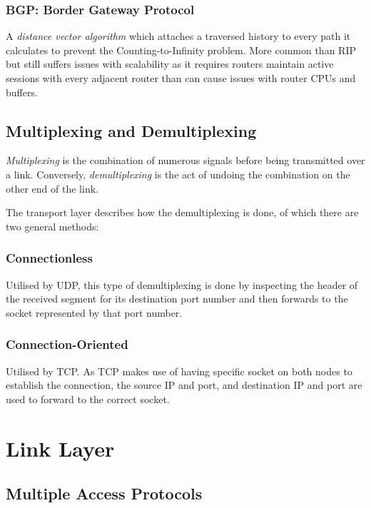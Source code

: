 \documentclass{article}
\begin{document}
\subsubsection{BGP: Border Gateway Protocol}
A \textit{distance vector algorithm} which attaches a traversed history to every path it calculates to prevent the Counting-to-Infinity problem. More common than RIP but still suffers issues with scalability as it requires routers maintain active sessions with every adjacent router than can cause issues with router CPUs and buffers.

\subsection{Multiplexing and Demultiplexing}

\textit{Multiplexing} is the combination of numerous signals before being transmitted over a link. Conversely, \textit{demultiplexing} is the act of undoing the combination on the other end of the link.

The transport layer describes how the demultiplexing is done, of which there are two general methods:

\subsubsection{Connectionless}

Utilised by UDP, this type of demultiplexing is done by inspecting the header of the received segment for its destination port number and then forwards to the socket represented by that port number.

\subsubsection{Connection-Oriented}

Utilised by TCP. As TCP makes use of having specific socket on both nodes to establish the connection, the source IP and port, and destination IP and port are used to forward to the correct socket.

\newpage
\section{Link Layer}

\subsection{Multiple Access Protocols}
\end{document}
